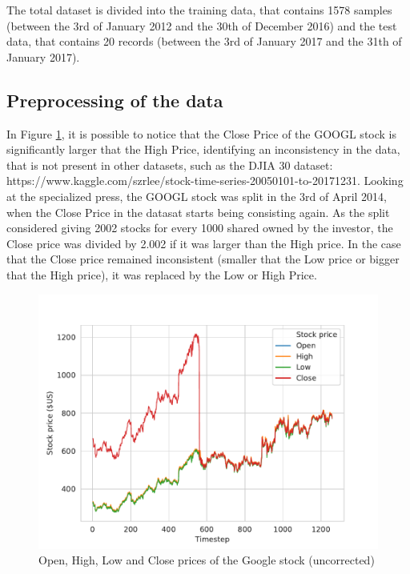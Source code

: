 \documentclass[10pt,twocolumn,letterpaper]{article}
\begin{document}
The total dataset is divided into the training data, that contains 1578 samples (between the 3rd of January 2012 and the 30th of December 2016) and the test data, that contains 20 records (between the 3rd of January 2017 and the 31th of January 2017).

\subsection{Preprocessing of the data}

In Figure \ref{fig:price}, it is possible to notice that the Close Price of the GOOGL stock is significantly larger that the High Price, identifying an inconsistency in the data, that is not present in other datasets, such as the DJIA 30 dataset: https://www.kaggle.com/szrlee/stock-time-series-20050101-to-20171231. Looking at the specialized press, the GOOGL stock was split in the 3rd of April 2014, when the Close Price in the datasat starts being consisting again. As the split considered giving 2002 stocks for every 1000 shared owned by the investor, the Close price was divided by 2.002 if it was larger than the High price. In the case that the Close price remained inconsistent (smaller that the Low price or bigger that the High price), it was replaced by the Low or High Price.

\begin{figure}[h]
	\begin{center}
		\includegraphics[width=1.0\linewidth]{stock_price.pdf}
	\end{center}
	\caption{Open, High, Low and Close prices of the Google stock (uncorrected)}
	\label{fig:price}
\end{figure}
\end{document}
